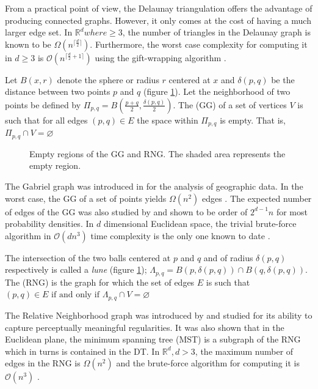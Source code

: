 From a practical point of view, the Delaunay triangulation offers the advantage of
producing connected graphs. However, it only comes at the cost of having a much larger edge set. In $\mathbb{R}^d where \geq 3$, the number of triangles in the Delaunay graph is known to be $\Omega(n^{\lceil\frac{d}{2} \rceil})$. Furthermore, the worst case complexity for computing it in $d \geq 3$ is $\mathcal{O}(n^{\lceil\frac{d}{2} +1 \rceil})$ using the gift-wrapping algorithm \parencite{Fortune1997}.

\begin{defn}
Let $B(x, r)$ denote the sphere or radius $r$ centered at $x$ and $\delta(p,q)$ be the distance between two points $p$ and $q$ (figure \ref{fig:erg-construct}). Let the neighborhood of two points be defined by $\Pi_{p,q} = B(\frac{p+q}{2}, \frac{\delta(p, q)}{2})$. The  (GG) of a set of vertices $V$ is such that for all edges $(p, q) \in E$  the space within $\Pi_{p,q}$ is empty. That is, $\Pi_{p,q} \cap V = \varnothing$
\end{defn}

\begin{figure}[ht]
\centering
\subbottom[GG]{%
}
\subbottom[RNG]{
}
\caption{Empty regions of the GG and RNG. The shaded area represents the empty region.}
\label{fig:erg-construct}
\end{figure}

The Gabriel graph was introduced in \cite{Gabriel1969} for the analysis of geographic data. In the worst case, the GG of a set of points yields $\Omega(n^2)$ edges \parencite{Toussaint1992}. The expected number of edges of the GG was also studied by \cite{Devroye1988} and shown to be order of $2^{d-1}n$ for most probability densities. In $d$ dimensional Euclidean space, the trivial brute-force algorithm in $\mathcal{O}(dn^3)$ time complexity is the only one known to date \parencite{Toussaint2012}.

\begin{defn}
The intersection of the two balls centered at $p$ and $q$ and of radius $\delta(p,q)$ respectively is called a \textit{lune} (figure \ref{fig:erg-construct}); $\Lambda_{p,q} = B(p, \delta(p,q)) \cap B(q, \delta(p,q))$. The  (RNG) is the graph for which the set of edges $E$ is such that $(p,q) \in E 	\text{ if and only if } \Lambda_{p,q} \cap V = \varnothing$ 
\end{defn}

The Relative Neighborhood graph was introduced by \cite{Toussaint1980} and studied for its ability to capture perceptually meaningful regularities. It was also shown that in the Euclidean plane, the minimum spanning tree (MST) is a subgraph of the RNG which in turns is contained in the DT. In $\mathbb{R}^d, d > 3$, the maximum number of edges in the RNG is $\Omega(n^2)$ \parencite{Toussaint1992} and the brute-force algorithm for computing it is $\mathcal{O}(n^3)$ \parencite{Toussaint1980}.

